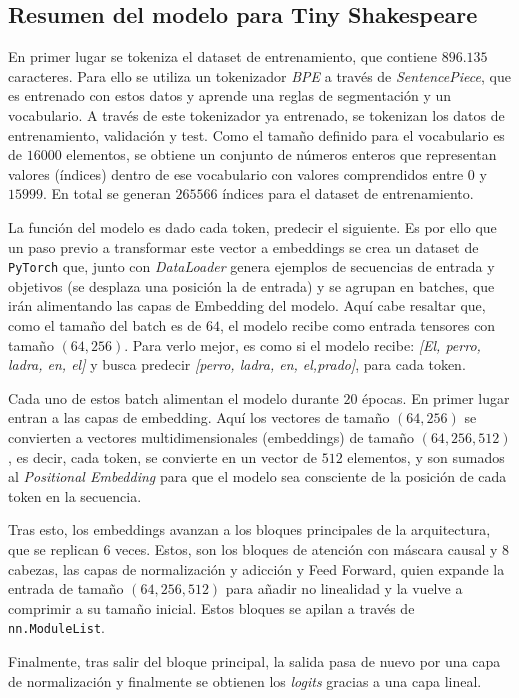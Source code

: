 \documentclass[11pt]{book}
\theoremstyle{plain}
\theoremstyle{definition}
\begin{document}
\subsection{Resumen del modelo para Tiny Shakespeare}

En primer lugar se tokeniza el dataset de entrenamiento, que contiene $896.135$ caracteres. Para ello se utiliza un tokenizador \textit{BPE} a través de \textit{SentencePiece}, que es entrenado con estos datos y aprende una reglas de segmentación y un vocabulario. A través de este tokenizador ya entrenado, se tokenizan los datos de entrenamiento, validación y test. Como el tamaño definido para el vocabulario es de $16000$ elementos, se obtiene un conjunto de números enteros que representan valores (índices) dentro de ese vocabulario con valores comprendidos entre $0$ y $15999$. En total se generan $265566$ índices para el dataset de entrenamiento. 

La función del modelo es dado cada token, predecir el siguiente. Es por ello que un paso previo a transformar este vector a embeddings se crea un dataset de \texttt{PyTorch} que, junto con \textit{DataLoader} genera ejemplos de secuencias de entrada y objetivos (se desplaza una posición la de entrada) y se agrupan en batches, que irán alimentando las capas de Embedding del modelo. Aquí cabe resaltar que, como el tamaño del batch es de $64$, el modelo recibe como entrada tensores con tamaño $(64,256)$. Para verlo mejor, es como si el modelo recibe: \textit{[El, perro, ladra, en, el]} y busca predecir \textit{[perro, ladra, en, el,prado]}, para cada token.


Cada uno de estos batch alimentan el modelo durante $20$ épocas. En primer lugar entran a las capas de embedding. Aquí los vectores de tamaño $(64,256)$ se convierten a vectores multidimensionales (embeddings) de tamaño $(64,256, 512)$, es decir, cada token, se convierte en un vector de $512$ elementos, y son sumados al \textit{Positional Embedding} para que el modelo sea consciente de la posición de cada token en la secuencia. 

Tras esto, los embeddings avanzan a los bloques principales de la arquitectura, que se replican $6$ veces. Estos, son los bloques de atención con máscara causal y 8 cabezas, las capas de normalización y adicción y Feed Forward, quien expande la entrada de tamaño $(64,256, 512)$ para añadir no linealidad y la vuelve a comprimir a su tamaño inicial. Estos bloques se apilan a través de \texttt{nn.ModuleList}. 

Finalmente, tras salir del bloque principal, la salida pasa de nuevo por una capa de normalización y finalmente se obtienen los \textit{logits} gracias a una capa lineal. 
\end{document}
